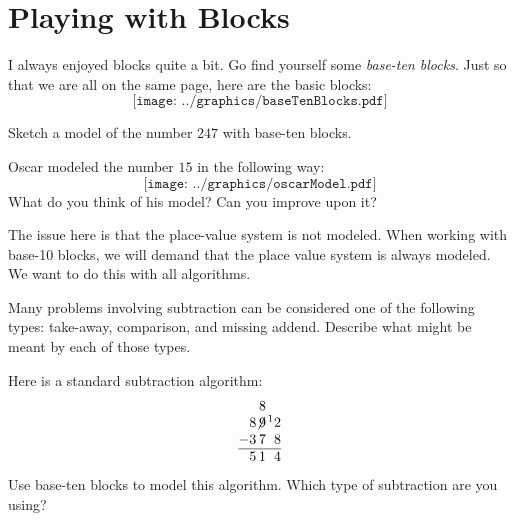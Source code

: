 \newpage
\section{Playing with Blocks}\label{A:B1}

I always enjoyed blocks quite a bit. Go find yourself
some \textit{base-ten blocks}. Just so that we are all on the same
page, here are the basic blocks:
\[
\texttt{[image: ../graphics/baseTenBlocks.pdf]}
\]

\begin{prob} 
Sketch a model of the number $247$ with base-ten blocks.
\vspace{0.8in}
\end{prob}

\begin{prob}
Oscar modeled the number $15$ in the following way:
\[
\texttt{[image: ../graphics/oscarModel.pdf]}
\]
What do you think of his model?  Can you improve upon it?  
\vspace{0.5in}
\end{prob}

\begin{teachingnote}
The issue here is that the place-value system is not modeled. When
working with base-10 blocks, we will demand that the place value
system is always modeled.  We want to do this with all algorithms.  
\end{teachingnote}

\begin{prob}
Many problems involving subtraction can be considered one of the following types:  take-away, comparison, and missing addend.  Describe what might be meant by each of those types.  
\end{prob}

\newpage

\begin{prob} 
Here is a standard subtraction algorithm:
\[
\begin{tabular}{@{}r@{}r@{}r@{}r@{}}
&   & 8 &  \\
& 8 & $\not{\hspace{-.2ex}9}$ & $\hspace{.3ex}\leftexp{1}2$\\
$-$ & 3 & 7 & 8\\ \hline
& 5 & 1 & 4
\end{tabular}
\]
Use base-ten blocks to model this algorithm.  Which type of subtraction are you using?  
\end{prob}

